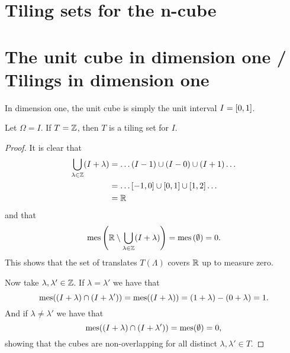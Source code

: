 \documentclass[../thesis.tex]{subfiles}
\begin{document}
\section{Tiling sets for the n-cube}
\section{The unit cube in dimension one / Tilings in dimension one}
In dimension one, the unit cube is simply the unit interval $I=[0,1]$.
\begin{theorem}  %
    Let $\Omega = I$. If $T=\mathbb{Z}$, then $T$ is a tiling set for $I$.
\end{theorem}

\begin{proof}
    It is clear that
    \begin{align*}
        \bigcup_{\lambda\in \mathbb{Z}} (I + \lambda) &= \dots (I-1) \cup (I-0) \cup (I+1) \dots\\ 
        &= \dots [-1,0] \cup [0,1] \cup [1,2] \dots\\
        &= \mathbb{R}
    \end{align*}
    and that 
    \begin{align*}
        \operatorname{mes}\left(\mathbb{R} \setminus \bigcup_{\lambda\in \mathbb{Z}} (I + \lambda) \right) = \operatorname{mes}\left(\emptyset\right) = 0.
    \end{align*}
    This shows that the set of translates $T(\Lambda)$ covers $\mathbb{R}$ up to measure zero. 
    
    Now take $\lambda,\lambda' \in \mathbb{Z}$. If $\lambda = \lambda'$ we have that
    \begin{equation*}
        \operatorname{mes}((I+\lambda) \cap (I+\lambda')) = \operatorname{mes}((I+\lambda)) = (1+\lambda) - (0+\lambda) = 1.
    \end{equation*}
    And if $\lambda \neq \lambda'$ we have that 
    \begin{equation*}
        \operatorname{mes}((I+\lambda) \cap (I+\lambda')) = \operatorname{mes}(\emptyset) = 0,
    \end{equation*}
    showing that the cubes are non-overlapping for all distinct $\lambda , \lambda' \in T$. 
\end{proof}
\end{document}
